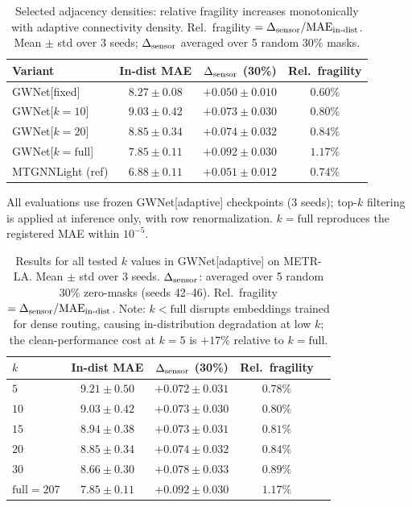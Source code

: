 \begin{table}[h]
\centering
\caption{Selected adjacency densities: relative fragility increases monotonically with
adaptive connectivity density.
Rel.\ fragility $= \Delta_{\text{sensor}} / \text{MAE}_\text{in-dist}$.
Mean $\pm$ std over 3 seeds; $\Delta_{\text{sensor}}$ averaged over 5 random 30\% masks.}
\label{tab:density_sweep}
\vskip 0.05in
\small
\begin{tabular}{lccc}
\toprule
\textbf{Variant} & \textbf{In-dist MAE} & \textbf{$\Delta_{\text{sensor}}$ (30\%)} & \textbf{Rel.\ fragility} \\
\midrule
GWNet[fixed]        & $8.27 \pm 0.08$ & $+0.050 \pm 0.010$ & $0.60\%$ \\
\midrule
GWNet[$k{=}10$]     & $9.03 \pm 0.42$ & $+0.073 \pm 0.030$ & $0.80\%$ \\
GWNet[$k{=}20$]     & $8.85 \pm 0.34$ & $+0.074 \pm 0.032$ & $0.84\%$ \\
GWNet[$k{=}\text{full}$] & $7.85 \pm 0.11$ & $+0.092 \pm 0.030$ & $1.17\%$ \\
\midrule
MTGNNLight (ref)    & $6.88 \pm 0.11$ & $+0.051 \pm 0.012$ & $0.74\%$ \\
\bottomrule
\end{tabular}
\end{table}
All evaluations use frozen GWNet[adaptive] checkpoints (3 seeds);
top-$k$ filtering is applied at inference only, with row renormalization.
$k{=}\text{full}$ reproduces the registered MAE within $10^{-5}$.

\begin{table}[h]
\centering
\caption{Results for all tested $k$ values in GWNet[adaptive] on METR-LA.
Mean $\pm$ std over 3 seeds.
$\Delta_{\text{sensor}}$: averaged over 5 random 30\% zero-masks (seeds 42--46).
Rel.\ fragility $= \Delta_{\text{sensor}} / \text{MAE}_\text{in-dist}$.
Note: $k{<}\text{full}$ disrupts embeddings trained for dense routing, causing
in-distribution degradation at low $k$; the clean-performance cost at $k{=}5$
is $+17\%$ relative to $k{=}\text{full}$.}
\label{tab:density_sweep_full}
\vskip 0.1in
\small
\begin{tabular}{lcccc}
\toprule
\textbf{$k$} & \textbf{In-dist MAE} & \textbf{$\Delta_{\text{sensor}}$ (30\%)} & \textbf{Rel.\ fragility} \\
\midrule
$5$          & $9.21 \pm 0.50$ & $+0.072 \pm 0.031$ & $0.78\%$ \\
$10$         & $9.03 \pm 0.42$ & $+0.073 \pm 0.030$ & $0.80\%$ \\
$15$         & $8.94 \pm 0.38$ & $+0.073 \pm 0.031$ & $0.81\%$ \\
$20$         & $8.85 \pm 0.34$ & $+0.074 \pm 0.032$ & $0.84\%$ \\
$30$         & $8.66 \pm 0.30$ & $+0.078 \pm 0.033$ & $0.89\%$ \\
$\text{full}=207$ & $7.85 \pm 0.11$ & $+0.092 \pm 0.030$ & $1.17\%$ \\
\bottomrule
\end{tabular}
\end{table}


